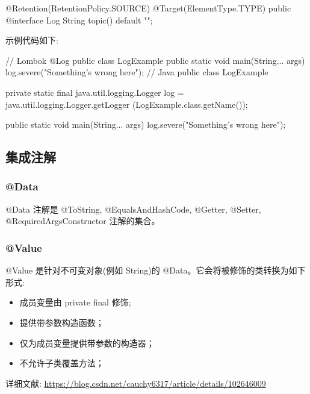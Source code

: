 \begin{Java}
@Retention(RetentionPolicy.SOURCE)
@Target(ElementType.TYPE)
public @interface Log {
    String topic() default "";
}
\end{Java}

示例代码如下:

\begin{Java}
// Lombok
@Log
public class LogExample {
    public static void main(String... args) {
        log.severe("Something's wrong here");
    }
}
// Java
public class LogExample {
    private static final java.util.logging.Logger log = java.util.logging.Logger.getLogger    (LogExample.class.getName());
    
    public static void main(String... args) {
        log.severe("Something's wrong here");
    }
}
\end{Java}

\subsection{集成注解}

\subsubsection{@Data}

@Data 注解是 @ToString, @EqualsAndHashCode, @Getter, @Setter, @RequiredArgsConstructor 注解的集合。

\subsubsection{@Value}

@Value 是针对不可变对象(例如 String)的 @Data。它会将被修饰的类转换为如下形式:

\begin{itemize}
    \item 成员变量由 private final 修饰; 
    \item 提供带参数构造函数；
    \item 仅为成员变量提供带参数的构造器；
    \item 不允许子类覆盖方法；
\end{itemize}

详细文献: \url{https://blog.csdn.net/cauchy6317/article/details/102646009}

\newpage